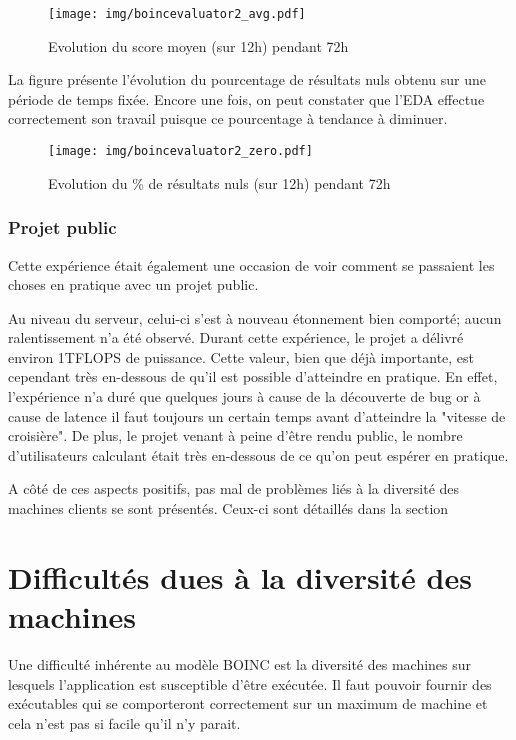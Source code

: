 \documentclass[a4paper, 11pt]{article}
\begin{document}
\begin{figure}[!h]
\centering
\texttt{[image: img/boincevaluator2\_avg.pdf]}
\caption{Evolution du score moyen (sur 12h) pendant 72h}%
\label{boincevaluator2_avg}
\end{figure}

La figure %
présente l'évolution du pourcentage de résultats nuls obtenu sur une période de temps fixée. Encore une fois, on peut constater que l'EDA effectue correctement son travail puisque ce pourcentage à tendance à diminuer.

\begin{figure}[!h]
\centering
\texttt{[image: img/boincevaluator2\_zero.pdf]}
\caption{Evolution du \% de résultats nuls (sur 12h) pendant 72h}%
\label{boincevaluator2_zero}
\end{figure}

\subsubsection{Projet public}
Cette expérience était également une occasion de voir comment se passaient les choses en pratique avec un projet public. 

Au niveau du serveur, celui-ci s'est à nouveau étonnement bien comporté; aucun ralentissement n'a été observé. Durant cette expérience, le projet a délivré environ 1TFLOPS de puissance. Cette valeur, bien que déjà importante, est cependant très en-dessous de qu'il est possible d'atteindre en pratique. En effet, l'expérience n'a duré que quelques jours à cause de la découverte de bug or à cause de latence il faut toujours un certain temps avant d'atteindre la "vitesse de croisière".  De plus, le projet venant à peine d'être rendu public, le nombre d'utilisateurs calculant était très en-dessous de ce qu'on peut espérer en pratique.

A côté de ces aspects positifs, pas mal de problèmes liés à la diversité des machines clients se sont présentés. Ceux-ci sont détaillés dans la section %

\section{Difficultés dues à la diversité des machines}
Une difficulté inhérente au modèle \textsc{BOINC} est la diversité des machines sur lesquels l'application est susceptible d'être exécutée. Il faut pouvoir fournir des exécutables qui se comporteront correctement sur un maximum de machine et cela n'est pas si facile qu'il n'y parait.
\end{document}

